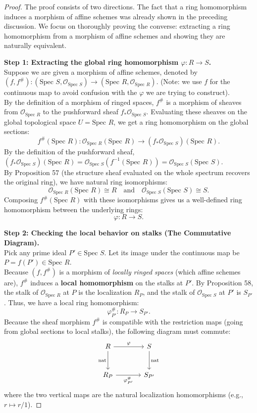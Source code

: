 \begin{proof}
The proof consists of two directions. The fact that a ring homomorphism induces a morphism of affine schemes was already shown in the preceding discussion. We focus on thoroughly proving the converse: extracting a ring homomorphism from a morphism of affine schemes and showing they are naturally equivalent.

\textbf{Step 1: Extracting the global ring homomorphism $\varphi: R \to S$.} \\
Suppose we are given a morphism of affine schemes, denoted by $(f, f^\#) : (\text{Spec } S, \mathcal{O}_{\text{Spec } S}) \to (\text{Spec } R, \mathcal{O}_{\text{Spec } R})$. (Note: we use $f$ for the continuous map to avoid confusion with the $\varphi$ we are trying to construct). \\
By the definition of a morphism of ringed spaces, $f^\#$ is a morphism of sheaves from $\mathcal{O}_{\text{Spec } R}$ to the pushforward sheaf $f_* \mathcal{O}_{\text{Spec } S}$. 
Evaluating these sheaves on the global topological space $U = \text{Spec } R$, we get a ring homomorphism on the global sections:
\[
f^\#(\text{Spec } R) : \mathcal{O}_{\text{Spec } R}(\text{Spec } R) \to (f_* \mathcal{O}_{\text{Spec } S})(\text{Spec } R).
\]
By the definition of the pushforward sheaf, $(f_* \mathcal{O}_{\text{Spec } S})(\text{Spec } R) = \mathcal{O}_{\text{Spec } S}(f^{-1}(\text{Spec } R)) = \mathcal{O}_{\text{Spec } S}(\text{Spec } S)$. \\
By Proposition 57 (the structure sheaf evaluated on the whole spectrum recovers the original ring), we have natural ring isomorphisms:
\[
\mathcal{O}_{\text{Spec } R}(\text{Spec } R) \cong R \quad \text{and} \quad \mathcal{O}_{\text{Spec } S}(\text{Spec } S) \cong S.
\]
Composing $f^\#(\text{Spec } R)$ with these isomorphisms gives us a well-defined ring homomorphism between the underlying rings:
\[
\varphi : R \to S.
\]

\textbf{Step 2: Checking the local behavior on stalks (The Commutative Diagram).} \\
Pick any prime ideal $P' \in \text{Spec } S$. Let its image under the continuous map be $P = f(P') \in \text{Spec } R$. \\
Because $(f, f^\#)$ is a morphism of \textit{locally ringed spaces} (which affine schemes are), $f^\#$ induces a \textbf{local homomorphism} on the stalks at $P'$. 
By Proposition 58, the stalk of $\mathcal{O}_{\text{Spec } R}$ at $P$ is the localization $R_P$, and the stalk of $\mathcal{O}_{\text{Spec } S}$ at $P'$ is $S_{P'}$. Thus, we have a local ring homomorphism:
\[
\varphi^\#_{P'} : R_P \to S_{P'}.
\]
Because the sheaf morphism $f^\#$ is compatible with the restriction maps (going from global sections to local stalks), the following diagram must commute:
\[
\begin{tikzcd}[row sep=large, column sep=large]
R \arrow[r, "\varphi"] \arrow[d, "\text{nat}"'] & S \arrow[d, "\text{nat}"] \\
R_P \arrow[r, "\varphi^\#_{P'}"'] & S_{P'}
\end{tikzcd}
\]
where the two vertical maps are the natural localization homomorphisms (e.g., $r \mapsto r/1$).


\end{proof}
